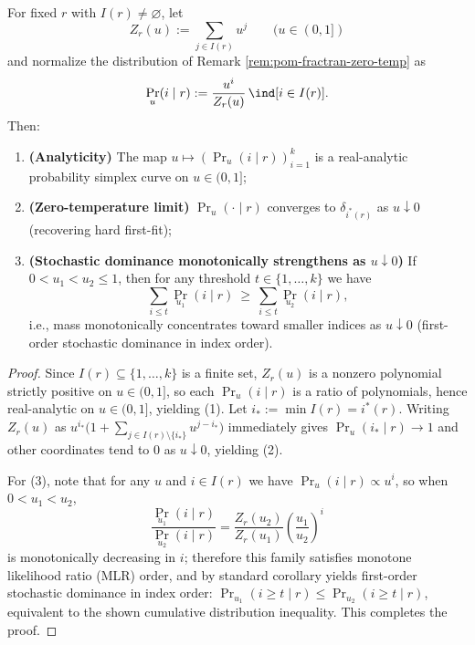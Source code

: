\begin{proposition}\label{prop:pom-fractran-soft-firstfit-analytic-dominance}
For fixed \(r\) with \(I(r)\neq\varnothing\), let
\[
Z_r(u):=\sum_{j\in I(r)}u^{j}\qquad(u\in(0,1])
\]
and normalize the distribution of Remark \ref{rem:pom-fractran-zero-temp} as
\[
\Pr_u(i\mid r):=\frac{u^{i}}{Z_r(u)}\,\ind[i\in I(r)].
\]
Then:
\begin{enumerate}
  \item \textbf{(Analyticity)} The map \(u\mapsto (\Pr_u(i\mid r))_{i=1}^{k}\) is a real-analytic probability simplex curve on \(u\in(0,1]\);
  \item \textbf{(Zero-temperature limit)} \(\Pr_u(\cdot\mid r)\) converges to \(\delta_{i^\ast(r)}\) as \(u\downarrow 0\) (recovering hard first-fit);
  \item \textbf{(Stochastic dominance monotonically strengthens as \(u\downarrow 0\))} If \(0<u_1<u_2\le 1\), then for any threshold \(t\in\{1,\dots,k\}\) we have
  \[
  \sum_{i\le t}\Pr_{u_1}(i\mid r)\ \ge\ \sum_{i\le t}\Pr_{u_2}(i\mid r),
  \]
  i.e., mass monotonically concentrates toward smaller indices as \(u\downarrow 0\) (first-order stochastic dominance in index order).
\end{enumerate}
\end{proposition}
\begin{proof}
Since \(I(r)\subseteq\{1,\dots,k\}\) is a finite set, \(Z_r(u)\) is a nonzero polynomial strictly positive on \(u\in(0,1]\), so each \(\Pr_u(i\mid r)\) is a ratio of polynomials, hence real-analytic on \(u\in(0,1]\), yielding (1).
Let \(i_\ast:=\min I(r)=i^\ast(r)\). Writing \(Z_r(u)\) as \(u^{i_\ast}\bigl(1+\sum_{j\in I(r)\setminus\{i_\ast\}}u^{j-i_\ast}\bigr)\) immediately gives \(\Pr_u(i_\ast\mid r)\to 1\) and other coordinates tend to \(0\) as \(u\downarrow 0\), yielding (2).
\par
For (3), note that for any \(u\) and \(i\in I(r)\) we have \(\Pr_u(i\mid r)\propto u^{i}\), so when \(0<u_1<u_2\),
\[
\frac{\Pr_{u_1}(i\mid r)}{\Pr_{u_2}(i\mid r)}
=
\frac{Z_r(u_2)}{Z_r(u_1)}\left(\frac{u_1}{u_2}\right)^{i}
\]
is monotonically decreasing in \(i\); therefore this family satisfies monotone likelihood ratio (MLR) order, and by standard corollary yields first-order stochastic dominance in index order:
\(
\Pr_{u_1}(i\ge t\mid r)\le \Pr_{u_2}(i\ge t\mid r)
\),
equivalent to the shown cumulative distribution inequality. This completes the proof.
\end{proof}

